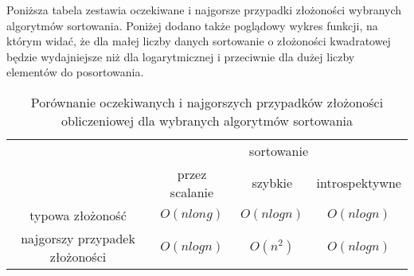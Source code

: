 Poniższa tabela zestawia oczekiwane i najgorsze przypadki złożoności wybranych algorytmów sortowania. Poniżej dodano także poglądowy wykres funkcji, na którym widać, że dla małej liczby danych sortowanie o złożoności kwadratowej będzie wydajniejsze niż dla logarytmicznej i przeciwnie dla dużej liczby elementów do posortowania.

\begin{table}[H]
    \centering
    \renewcommand{\tablename}{Tab.}
    \caption{Porównanie oczekiwanych i najgorszych przypadków złożoności obliczeniowej dla wybranych algorytmów sortowania}
    \label{tab: opis_zlozonosc}
    \begin{tabular}{c|ccc|}
        \cline{2-4}
        & \multicolumn{3}{c|}{sortowanie}   \\ \cline{2-4} & \multicolumn{1}{c|}{przez scalanie} & \multicolumn{1}{c|}{szybkie} & introspektywne \\ \hline
        \multicolumn{1}{|c|}{typowa złożoność} & \multicolumn{1}{c|}{$O(nlong)$} & \multicolumn{1}{c|}{$O(nlogn)$} & $O(nlogn)$       \\ \hline
        \multicolumn{1}{|c|}{najgorszy przypadek złożoności} & \multicolumn{1}{c|}{$O(nlogn)$} & \multicolumn{1}{c|}{$O(n^2)$} & $O(nlogn)$       \\ \hline
    \end{tabular}
\end{table}

\begin{figure}[H]
    \centering
    \renewcommand{\figurename}{Rys.}
    \caption{}
    \label{fig: }
\end{figure}


